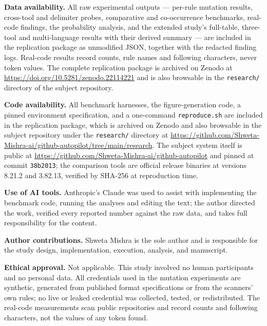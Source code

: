 \documentclass[pdflatex,sn-basic]{sn-jnl}
\begin{document}
\textbf{Data availability.} All raw experimental outputs --- per-rule mutation results, cross-tool and delimiter probes, comparative and co-occurrence benchmarks, real-code findings, the probability analysis, and the extended study's full-table, three-tool and multi-language results with their derived summary --- are included in the replication package as unmodified JSON, together with the redacted finding logs. Real-code results record counts, rule names and following characters, never token values. The complete replication package is archived on Zenodo at \url{https://doi.org/10.5281/zenodo.22114221} \citep{mishra2026zenodo} and is also browsable in the \texttt{research/} directory of the subject repository.

\textbf{Code availability.} All benchmark harnesses, the figure-generation code, a pinned environment specification, and a one-command \texttt{reproduce.sh} are included in the replication package, which is archived on Zenodo and also browsable in the subject repository under the \texttt{research/} directory at \url{https://github.com/Shweta-Mishra-ai/github-autopilot/tree/main/research}. The subject system itself is public at \url{https://github.com/Shweta-Mishra-ai/github-autopilot} and pinned at commit \texttt{38b2013}; the comparison tools are official release binaries at versions 8.21.2 and 3.82.13, verified by SHA-256 at reproduction time.

\textbf{Use of AI tools.} Anthropic's Claude was used to assist with implementing the benchmark code, running the analyses and editing the text; the author directed the work, verified every reported number against the raw data, and takes full responsibility for the content.

\textbf{Author contributions.} Shweta Mishra is the sole author and is responsible for the study design, implementation, execution, analysis, and manuscript.

\textbf{Ethical approval.} Not applicable. This study involved no human participants and no personal data. All credentials used in the mutation experiments are synthetic, generated from published format specifications or from the scanners' own rules; no live or leaked credential was collected, tested, or redistributed. The real-code measurements scan public repositories and record counts and following characters, not the values of any token found.
\end{document}
